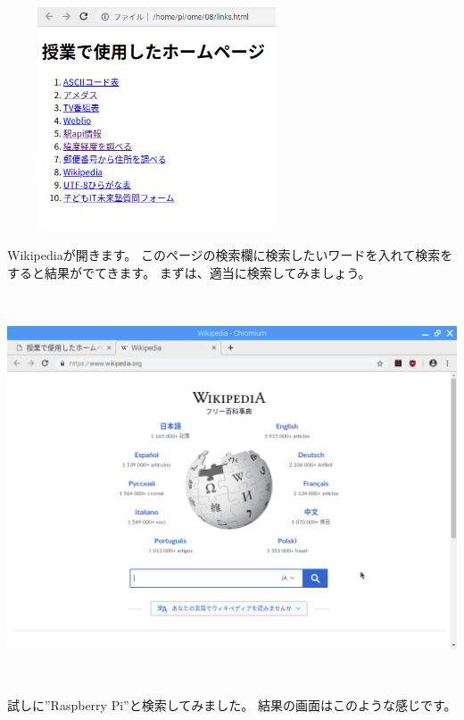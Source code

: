 \documentclass[a4paper,12pt,dvipdfmx]{jarticle}
\begin{document}
\begin{center}
\includegraphics[width=8.881cm,height=6.599cm]{textbook-img017.png}

\end{center}

\bigskip


\bigskip

Wikipediaが開きます。
このページの検索欄に検索したいワードを入れて検索をすると結果がでてきます。
まずは、適当に検索してみましょう。



\begin{center}
\includegraphics[width=16.007cm,height=11.442cm]{textbook-img058.png}

\end{center}
\clearpage
試しに”Raspberry
Pi”と検索してみました。
結果の画面はこのような感じです。
\end{document}

